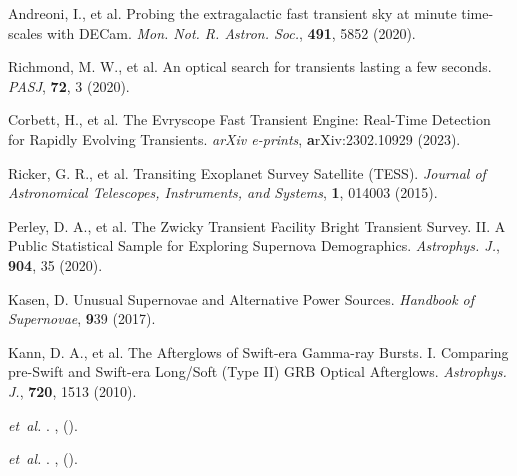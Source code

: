 \documentclass{nature_plusfigure}
\newcommand{\mn}{{Mon. Not. R. Astron. Soc.}}
\newcommand{\mnras}{\mn}
\newcommand{\apj}{{Astrophys. J.}}
\newcommand{\apjl}{{Astrophys. J. Lett.}}
\newcommand{\pasj}{{PASJ}}
\begin{document}
\begin{thebibliography}{100}

 Andreoni, I., et al. Probing the extragalactic fast transient sky at minute time-scales with DECam. \emph{\mnras}, \textbf{491}, 5852 (2020). 

 Richmond, M. W., et al. An optical search for transients lasting a few seconds. \emph{\pasj}, \textbf{72}, 3 (2020). 

 Corbett, H., et al. The Evryscope Fast Transient Engine: Real-Time Detection for Rapidly Evolving Transients. \emph{arXiv e-prints}, \textbf arXiv:2302.10929 (2023). 


  Ricker, G. R., et al. Transiting Exoplanet Survey Satellite (TESS). \emph{Journal of Astronomical Telescopes, Instruments, and Systems}, \textbf{1}, 014003 (2015). 
 
 
  Perley, D. A., et al. The Zwicky Transient Facility Bright Transient Survey. II. A Public Statistical Sample for Exploring Supernova Demographics. \emph{\apj}, \textbf{904}, 35 (2020). 
 
  Kasen, D. Unusual Supernovae and Alternative Power Sources. \emph{Handbook of Supernovae}, \textbf 939 (2017). 
 
 
 
  Kann, D. A., et al. The Afterglows of Swift-era Gamma-ray Bursts. I. Comparing pre-Swift and Swift-era Long/Soft (Type II) GRB Optical Afterglows. \emph{\apj}, \textbf{720}, 1513 (2010). 
 
 \emph{et~al.}
\newblock {}.
\newblock \emph{\bibinfo{journal}{\apjl}} \textbf{},
   ().

 \emph{et~al.}
\newblock {}.
\newblock \emph{} \textbf{},
   ().


\end{thebibliography}
\end{document}

